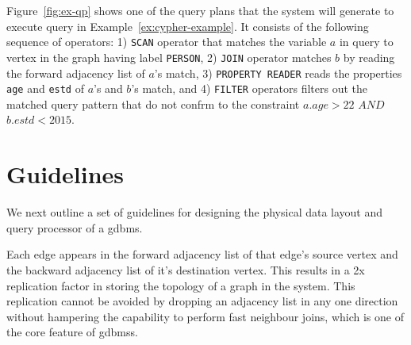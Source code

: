 Figure~\ref{fig:ex-qp} shows one of the query plans that the system will generate to execute query in Example~\ref{ex:cypher-example}. It consists of the following sequence of operators: 1) \texttt{SCAN} operator that matches the variable $a$ in query to vertex in the graph having label \texttt{PERSON}, 2) \texttt{JOIN} operator matches $b$ by reading the forward adjacency list of $a$'s match, 3) \texttt{PROPERTY READER} reads the properties \texttt{age} and \texttt{estd} of $a$'s and $b$'s match, and 4) \texttt{FILTER} operators filters out the matched query pattern that do not confrm to the constraint $a.age > 22$ $AND$ $b.estd < 2015$.

\section{Guidelines}
\label{sec:guidelines}

We next outline a set of guidelines for designing the physical data layout and query processor of a \gls{gdbms}.

\begin{guideline}
\vspace{-5pt}
Each edge appears in the forward adjacency list of that edge's source vertex and the backward adjacency list of it's destination vertex. This results in a 2x replication factor in storing the topology of a graph in the system. This  replication cannot be avoided by dropping an adjacency list in any one direction without hampering the capability to perform fast neighbour joins, which is one of the core feature of \gls{gdbms}s.
\end{guideline}

